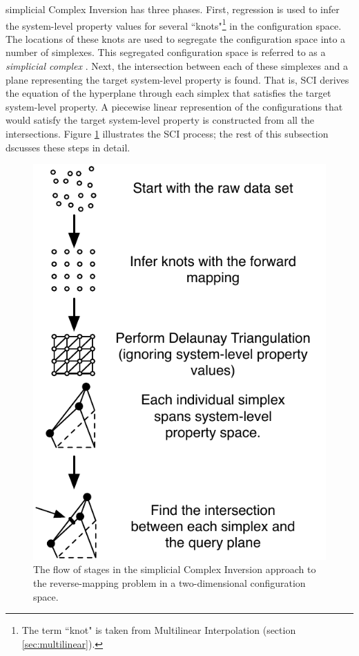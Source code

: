 simplicial Complex Inversion has three phases.
First, regression is used to infer the system-level property values for several ``knots"\footnote{The term ``knot" is taken from Multilinear Interpolation \cite{davies1997multidimensional} (section \ref{sec:multilinear}).} in the configuration space.
The locations of these knots are used to segregate the configuration space into a number of simplexes.
This segregated configuration space is referred to as a \textit{simplicial complex} \cite{munkres1993simplicial}.
Next, the intersection between each of these simplexes and a plane representing the target system-level property is found.
That is, SCI derives the equation of the hyperplane through each simplex that satisfies the target system-level property.
A piecewise linear represention of the configurations that would satisfy the target system-level property is constructed from all the intersections.
Figure \ref{fig:ISFlow} illustrates the SCI process; the rest of this subsection dscusses these steps in detail.

\begin{figure}[ht]
\centering
\includegraphics[scale=1]{images/ISflow.pdf}
\caption{The flow of stages in the simplicial Complex Inversion approach to the reverse-mapping problem in a two-dimensional configuration space.}
\label{fig:ISFlow}
\end{figure}

